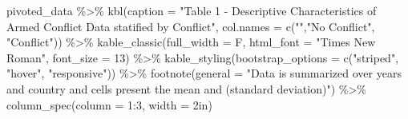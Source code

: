 \documentclass[
  letterpaper,
  DIV=11,
  numbers=noendperiod]{scrartcl}
\newenvironment{Shaded}{\begin{snugshade}}{\end{snugshade}}
\newcommand{\AttributeTok}[1]{\textcolor[rgb]{0.40,0.45,0.13}{#1}}
\newcommand{\DecValTok}[1]{\textcolor[rgb]{0.68,0.00,0.00}{#1}}
\newcommand{\FunctionTok}[1]{\textcolor[rgb]{0.28,0.35,0.67}{#1}}
\newcommand{\NormalTok}[1]{\textcolor[rgb]{0.00,0.23,0.31}{#1}}
\newcommand{\SpecialCharTok}[1]{\textcolor[rgb]{0.37,0.37,0.37}{#1}}
\newcommand{\StringTok}[1]{\textcolor[rgb]{0.13,0.47,0.30}{#1}}
\begin{document}
\begin{Shaded}
\begin{Highlighting}[]
\NormalTok{pivoted\_data }\SpecialCharTok{\%\textgreater{}\%} 
  \FunctionTok{kbl}\NormalTok{(}\AttributeTok{caption =} \StringTok{"Table 1 {-} Descriptive Characteristics of Armed Conflict Data }
\StringTok{      statified by Conflict"}\NormalTok{, }\AttributeTok{col.names =} \FunctionTok{c}\NormalTok{(}\StringTok{""}\NormalTok{,}\StringTok{"No Conflict"}\NormalTok{, }\StringTok{"Conflict"}\NormalTok{)) }\SpecialCharTok{\%\textgreater{}\%} 
  \FunctionTok{kable\_classic}\NormalTok{(}\AttributeTok{full\_width =}\NormalTok{ F, }\AttributeTok{html\_font =} \StringTok{"Times New Roman"}\NormalTok{, }\AttributeTok{font\_size =} \DecValTok{13}\NormalTok{) }\SpecialCharTok{\%\textgreater{}\%} 
  \FunctionTok{kable\_styling}\NormalTok{(}\AttributeTok{bootstrap\_options =} \FunctionTok{c}\NormalTok{(}\StringTok{"striped"}\NormalTok{, }\StringTok{"hover"}\NormalTok{, }\StringTok{"responsive"}\NormalTok{)) }\SpecialCharTok{\%\textgreater{}\%} 
  \FunctionTok{footnote}\NormalTok{(}\AttributeTok{general =} \StringTok{"Data is summarized over years and country and cells present the mean and (standard deviation)"}\NormalTok{) }\SpecialCharTok{\%\textgreater{}\%} 
  \FunctionTok{column\_spec}\NormalTok{(}\AttributeTok{column =} \DecValTok{1}\SpecialCharTok{:}\DecValTok{3}\NormalTok{, }\AttributeTok{width =} \StringTok{\textquotesingle{}2in\textquotesingle{}}\NormalTok{)}
\end{Highlighting}
\end{Shaded}
\end{document}
